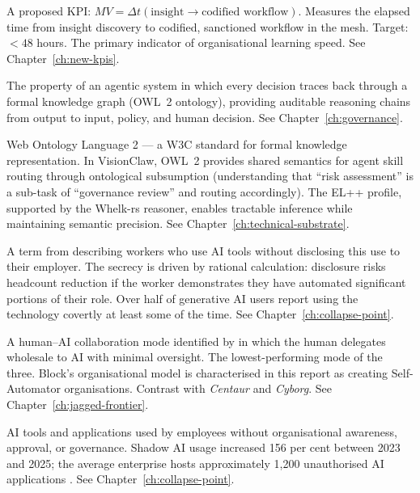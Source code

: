\begin{description}[style=nextline, leftmargin=2em, font=\bfseries\color{navyblue}]
\item[Mesh Velocity (MV)]
A proposed KPI: $MV = \Delta t(\text{insight} \rightarrow \text{codified workflow})$. Measures the elapsed time from insight discovery to codified, sanctioned workflow in the mesh. Target: $<48$ hours. The primary indicator of organisational learning speed. See Chapter~\ref{ch:new-kpis}.

\item[Ontological Provenance]
The property of an agentic system in which every decision traces back through a formal knowledge graph (OWL~2 ontology), providing auditable reasoning chains from output to input, policy, and human decision. See Chapter~\ref{ch:governance}.

\item[OWL~2]
Web Ontology Language 2 --- a W3C standard for formal knowledge representation. In VisionClaw, OWL~2 provides shared semantics for agent skill routing through ontological subsumption (understanding that ``risk assessment'' is a sub-task of ``governance review'' and routing accordingly). The EL++ profile, supported by the Whelk-rs reasoner, enables tractable inference while maintaining semantic precision. See Chapter~\ref{ch:technical-substrate}.

\item[Secret Cyborg]
A term from \textcite{Mollick2023SecretCyborgs} describing workers who use AI tools without disclosing this use to their employer. The secrecy is driven by rational calculation: disclosure risks headcount reduction if the worker demonstrates they have automated significant portions of their role. Over half of generative AI users report using the technology covertly at least some of the time. See Chapter~\ref{ch:collapse-point}.

\item[Self-Automator]
A human--AI collaboration mode identified by \textcite{Randazzo2024} in which the human delegates wholesale to AI with minimal oversight. The lowest-performing mode of the three. Block's organisational model is characterised in this report as creating Self-Automator organisations. Contrast with \emph{Centaur} and \emph{Cyborg}. See Chapter~\ref{ch:jagged-frontier}.

\item[Shadow AI]
AI tools and applications used by employees without organisational awareness, approval, or governance. Shadow AI usage increased 156 per cent between 2023 and 2025; the average enterprise hosts approximately 1,200 unauthorised AI applications \parencite{Gartner2025}. See Chapter~\ref{ch:collapse-point}.


\end{description}
